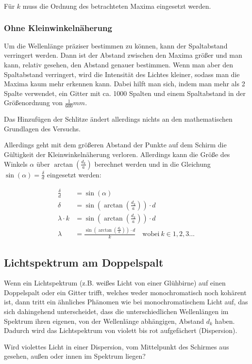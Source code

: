 \noindent Für $k$ muss die Ordnung des betrachteten Maxima eingesetzt werden.
		

\subsubsection{Ohne Kleinwinkelnäherung}

Um die Wellenlänge präziser bestimmen zu können, kann der Spaltabstand verringert werden. Dann ist der Abstand zwischen den Maxima größer und man kann, relativ gesehen, den Abstand genauer bestimmen. Wenn man aber den Spaltabstand verringert, wird die Intensität des Lichtes kleiner, sodass man die Maxima kaum mehr erkennen kann. Dabei hilft man sich, indem man mehr als 2 Spalte verwendet, ein Gitter mit ca. 1000 Spalten und einem Spaltabstand in der Größenordnung von $\frac{1}{600}mm$.

Das Hinzufügen der Schlitze ändert allerdings nichts an den mathematischen Grundlagen des Versuchs.
	
Allerdings geht mit dem größeren Abstand der Punkte auf dem Schirm die Gültigkeit der Kleinwinkelnäherung verloren. Allerdings kann die Größe des Winkels $\alpha$ über $\arctan{(\frac{d_k}{a})}$ berechnet werden und in die Gleichung $\sin{(\alpha)} = \frac{\delta}{d}$ eingesetzt werden:
	
\begin{align}
\begin{split}
		\frac{\delta}{d} &= \sin{(\alpha)} \\
		\delta &= \sin{(\arctan{(\frac{d_k}{a})})} \cdot d \\
		\lambda \cdot k &= \sin{(\arctan{(\frac{d_k}{a})})} \cdot d \\
		\lambda &= \frac{\sin{(\arctan{(\frac{d_k}{a})})} \cdot d}{k} \quad \text{wobei} \ k \in 1,2,3...
\end{split}
\end{align}


\subsection{Lichtspektrum am Doppelspalt}

Wenn ein Lichtspektrum (z.B. weißes Licht von einer Glühbirne) auf einen Doppelspalt oder ein Gitter trifft, welches weder monochromatisch noch kohärent ist, dann tritt ein ähnliches Phänomen wie bei monochromatischem Licht auf, das sich dahingehend unterscheidet, dass die unterschiedlichen Wellenlängen im Spektrum ihren eigenen, von der Wellenlänge abhängigen, Abstand $d_k$ haben. Dadurch wird das Lichtspektrum von violett bis rot aufgefächert (\glqq Dispersion\grqq ).

\begin{Aufgabe}
Wird violettes Licht in einer Dispersion, vom Mittelpunkt des Schirmes aus gesehen, außen oder innen im Spektrum liegen?
\end{Aufgabe}